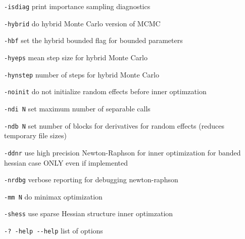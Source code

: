 \documentclass[a4paper,10pt,notumble]{leaflet}
\begin{document}
{\verb|-isdiag|         print importance sampling diagnostics

\verb|-hybrid|         do hybrid Monte Carlo version of MCMC

\verb|-hbf|            set the hybrid bounded flag for bounded parameters

\verb|-hyeps|          mean step size for hybrid Monte Carlo

\verb|-hynstep|        number of steps for hybrid Monte Carlo

\verb|-noinit|         do not initialize random effects before inner optimzation

\verb|-ndi N|          set maximum number of separable calls

\verb|-ndb N|          set number of blocks for derivatives for random effects (reduces temporary file sizes)

\verb|-ddnr|           use high precision Newton-Raphson for inner optimization for banded hessian case ONLY even if implemented

\verb|-nrdbg|           verbose reporting for debugging newton-raphson

\verb|-mm N|          do minimax optimization

\verb|-shess|         use sparse Hessian structure inner optimzation

\verb|-? -help --help| list of options
}
\end{document}
